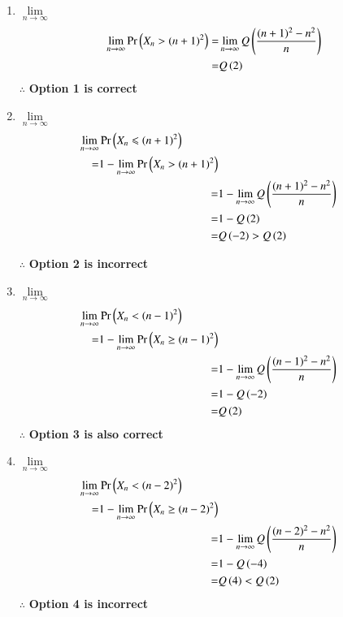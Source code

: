 \documentclass[journal,12pt,twocolumn]{IEEEtran}
\begin{document}
{
\begin{enumerate}
\item $\lim \limits_{n \to \infty} $ 
\begin{align}
    \lim \limits_{n \to \infty} \Pr\left(X_n > (n+1)^2\right) =& \lim \limits_{n \to \infty}Q \left(\frac{(n+1)^2-n^2}{n}\right)
    \\=&Q\left(2\right)
\end{align}
$\mathbf{\therefore}$ \textbf{Option 1 is correct}
\vspace{0.4cm}
\item $\lim \limits_{n \to \infty} $ 
\begin{align}
\begin{split}
    \lim \limits_{n \to \infty} & \Pr\left(X_n \leqslant (n+1)^2\right)\\ =&1-\lim \limits_{n \to \infty}  \Pr\left(X_n > (n+1)^2\right)
\end{split}
    \\=&1- \lim \limits_{n \to \infty}Q \left(\frac{(n+1)^2-n^2}{n}\right)
    \\=&1- Q \left(2\right)
    \\ =& Q\left(-2\right) > Q\left(2\right)
\end{align}

$\mathbf{\therefore}$ \textbf{Option 2 is incorrect}
\vspace{0.4cm}
\item $\lim \limits_{n \to \infty} $ 
\begin{align}
\begin{split}
    \lim \limits_{n \to \infty} & \Pr\left(X_n < (n-1)^2\right)\\ =&1-\lim \limits_{n \to \infty}  \Pr\left(X_n \geq (n-1)^2\right)
\end{split}
    \\=&1-\lim \limits_{n \to \infty}Q \left(\frac{(n-1)^2-n^2}{n}\right)
    \\=& 1-Q \left(-2\right)
    \\=& Q\left(2\right)
\end{align}
$\mathbf{\therefore}$ \textbf{Option 3 is also correct}
\vspace{0.4cm}
\item $\lim \limits_{n \to \infty} $ 
\begin{align}
   \begin{split}
    \lim \limits_{n \to \infty} & \Pr\left(X_n < (n-2)^2\right)\\ =&1-\lim \limits_{n \to \infty}  \Pr\left(X_n \geq (n-2)^2\right)
\end{split}
    \\=&1-\lim \limits_{n \to \infty}Q \left(\frac{(n-2)^2-n^2}{n}\right)
    \\=&1- Q \left(-4\right)
    \\=& Q\left(4\right) < Q \left(2\right)
\end{align}
$\mathbf{\therefore}$ \textbf{Option 4 is incorrect}
\end{enumerate}
}%
\end{document}

